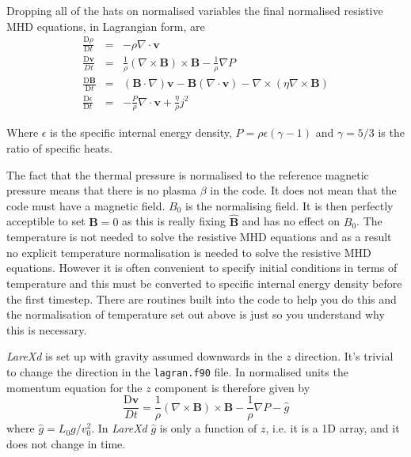 \documentclass[11pt]{article}
\begin{document}
Dropping all of the hats on normalised variables the final normalised resistive MHD equations, in Lagrangian form, are
\begin{eqnarray}
\frac{\mathrm{D}\rho}{\mathrm{D}t}&=&-\rho \nabla\cdot \mathbf{v}\\
\frac{\mathrm{D}\mathbf{v}}{Dt}&=&\frac{1}{\rho}(\nabla\times\mathbf{B})\times\mathbf{B}
-\frac{1}{\rho}\nabla P \label{velocity_eqn}\\
\frac{\mathrm{D}\mathbf{B}}{\mathrm{D}t}&=&(\mathbf{B}\cdot\nabla)\mathbf{v}-\mathbf{B}
(\nabla\cdot\mathbf{v})-\nabla\times(\eta\nabla\times\mathbf{B})\\
\frac{\mathrm{D}\epsilon}{\mathrm{D}t}&=&-\frac{P}{\rho}\nabla\cdot\mathbf{v}+\frac
{\eta}{\rho}j^{2} \label{energy_eqn}
\end{eqnarray}

Where $\epsilon$ is the specific internal energy density, $P = \rho \epsilon(\gamma - 1)$ and $\gamma = 5/3$ is the ratio of specific heats.

The fact that the thermal pressure is normalised to the reference magnetic pressure means that there is no plasma $\beta$ in the code. It does not mean that the code must have a magnetic field. $B_0$ is the normalising field. It is then perfectly acceptible to set $\mathbf{B}=0$ as this is really fixing $\hat{\mathbf{B}}$ and has no effect on  $B_0$. The temperature is not needed to solve the resistive MHD equations and as a result no explicit temperature normalisation is needed to solve the resistive MHD equations. However it is often convenient to specify initial conditions in terms of temperature and this must be converted to specific internal energy density before the first timestep. There are routines built into the code to help you do this and the normalisation of temperature set out above is just so you understand why this is necessary. 

{\it LareXd} is set up with gravity assumed downwards in the $z$ direction. It's trivial to change the direction in the \texttt{lagran.f90} file. In normalised units the momentum equation for the $z$ component is therefore given by
\begin{displaymath}
 \frac{\mathrm{D}\mathbf{v}}{Dt}=\frac{1}{\rho}(\nabla\times\mathbf{B})\times\mathbf{B}
-\frac{1}{\rho}\nabla P-\hat{g}
\end{displaymath} 
where $\hat{g}=L_0 g / v_0^2$. In {\it LareXd} $\hat{g}$ is only a function of $z$, i.e. it is a 1D array, and it does not change in time.
\end{document}
